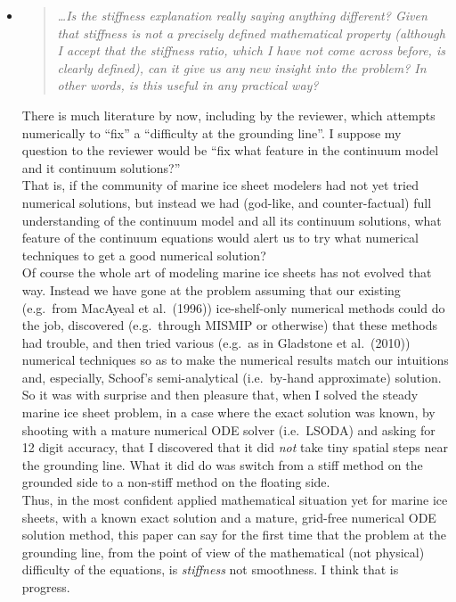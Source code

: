 \documentclass[11pt,reqno]{amsart}
\newcommand{\reply}[2]{
\medskip\medskip
\item  \begin{quote}
\emph{#1}
\end{quote}

\medskip
\noindent #2}
\begin{document}
\begin{itemize}
\reply{\dots Is the stiffness explanation really saying anything different? Given that stiffness is not a precisely defined mathematical property (although I accept that the stiffness ratio, which I have not come across before, is clearly defined), can it give us any new insight into the problem? In other words, is this useful in any practical way?}
{There is much literature by now, including by the reviewer, which attempts numerically to ``fix'' a ``difficulty at the grounding line''.  I suppose my question to the reviewer would be ``fix what feature in the continuum model and it continuum solutions?''  \medskip \\
That is, if the community of marine ice sheet modelers had not yet tried numerical solutions, but instead we had (god-like, and counter-factual) full understanding of the continuum model and all its continuum solutions, what feature of the continuum equations would alert us to try what numerical techniques to get a good numerical solution? \medskip \\
Of course the whole art of modeling marine ice sheets has not evolved that way.  Instead we have gone at the problem assuming that our existing (e.g.~from MacAyeal et al.~(1996)) ice-shelf-only numerical methods could do the job, discovered (e.g.~through MISMIP or otherwise) that these methods had trouble, and then tried various (e.g.~as in Gladstone et al.~(2010)) numerical techniques so as to make the numerical results match our intuitions and, especially, Schoof's semi-analytical (i.e.~by-hand approximate) solution. \medskip \\
So it was with surprise and then pleasure that, when I solved the steady marine ice sheet problem, in a case where the exact solution was known, by shooting with a mature numerical ODE solver (i.e.~LSODA) and asking for 12 digit accuracy, that I discovered that it did \emph{not} take tiny spatial steps near the grounding line.  What it did do was switch from a stiff method on the grounded side to a non-stiff method on the floating side. \medskip \\
Thus, in the most confident applied mathematical situation yet for marine ice sheets, with a known exact solution and a mature, grid-free numerical ODE solution method, this paper can say for the first time that the problem at the grounding line, from the point of view of the mathematical (not physical) difficulty of the equations, is \emph{stiffness} not smoothness.  I think that is progress.}


\end{itemize}
\end{document}
